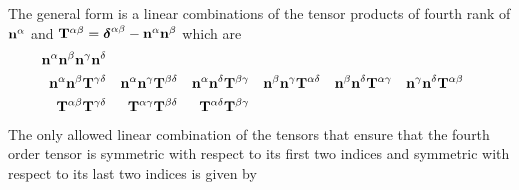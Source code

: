 \documentclass[b5paper,openright,10pt]{book}
\begin{document}
\begin{appendices}
The general  form  is  a linear  combinations  of the  tensor
products      of     fourth      rank     of      ${\bf     n}^\alpha$
and ${\bf T}^{\alpha\beta}=\boldsymbol{\delta}^{\alpha\beta}-{\bf n}^{\alpha}{\bf n}^{\beta}$ which are
\begin{align}
 {\bf n}^\alpha  {\bf n}^\beta   {\bf n}^\gamma   {\bf n}^\delta && && && && && &&
\nonumber\\
{\bf n}^\alpha  {\bf n}^\beta {\bf T}^{\gamma\delta} &&  
{\bf n}^\alpha  {\bf n}^\gamma {\bf T}^{\beta\delta} &&
{\bf n}^\alpha  {\bf n}^\delta {\bf T}^{\beta\gamma} &&
{\bf n}^\beta  {\bf n}^\gamma {\bf T}^{\alpha\delta} &&  
{\bf n}^\beta  {\bf n}^\delta {\bf T}^{\alpha\gamma} &&
{\bf n}^\gamma  {\bf n}^\delta {\bf T}^{\alpha\beta} &&
\nonumber\\
{\bf T}^{\alpha\beta}{\bf T}^{\gamma\delta}&&
{\bf T}^{\alpha\gamma}{\bf T}^{\beta\delta}&&
{\bf T}^{\alpha\delta}{\bf T}^{\beta\gamma}&& && && &&
\end{align}
The only  allowed linear combination  of the tensors that  ensure that
the fourth  order tensor is  symmetric with  respect to its  first two
indices and symmetric with respect to its last two indices is given by


\end{appendices}
\end{document}
